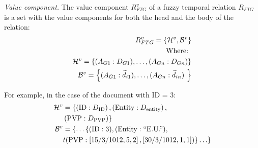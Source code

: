 
\begin{definition}
\label{def:value-component}
\emph{Value component.}
The value component $R^{v}_{FTG}$ of a fuzzy temporal relation $R_{FTG}$ is a set with the value components for both the head and the body of the relation:
\begin{align}
\label{eq:value-component}
R^{v}_{FTG} = \left \lbrace \mathcal{H}^{v},\mathcal{B}^{v} \right \rbrace \\
\nonumber
\text{Where: } \\
\nonumber
\mathcal{H}^{v} = \left \lbrace (A_{G1}:D_{G1}), \ldots,  (A_{Gn}:D_{Gn}) \right \rbrace \\
\nonumber
\mathcal{B}^ {v} = \left \lbrace (A_{G1}:\widetilde{d}_{i1}), \ldots,  (A_{Gn}:\widetilde{d}_{in})\ \right \rbrace 
\end{align}
\end{definition}

For example, in the case of the document with ID = 3:
\begin{align}
\nonumber
\mathcal{H}^{v} &=  \lbrace \left(\text{ID}:D_{\text{ID}}\right), \left(\text{Entity}:D_{\text{entity}}\right),\\
\nonumber
& \left(\text{PVP}:D_{\text{PVP}}\right) \rbrace \\
\nonumber
\mathcal{B}^ {v} &= \{\ldots \{ (\text{ID}:3), (\text{Entity}:\text{``E.U.''}) ,\\
\nonumber
& t(\text{PVP}:\left[15/3/1012,5,2\right], \left[30/3/1012,1,1\right]) \} \ldots\}
\end{align}


